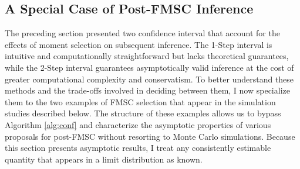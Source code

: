 \subsection{A Special Case of Post-FMSC Inference}
\label{sec:limitexperiment}
The preceding section presented two confidence interval that account for the effects of moment selection on subsequent inference.
The 1-Step interval is intuitive and computationally straightforward but lacks theoretical guarantees, while the 2-Step interval guarantees asymptotically valid inference at the cost of greater computational complexity and conservatism.
To better understand these methods and the trade-offs involved in deciding between them, I now specialize them to the two examples of FMSC selection that appear in the simulation studies described below.
The structure of these examples allows us to bypass Algorithm \ref{alg:conf} and characterize the asymptotic properties of various proposals for post-FMSC without resorting to Monte Carlo simulations.
Because this section presents asymptotic results, I treat any consistently estimable quantity that appears in a limit distribution as known.

